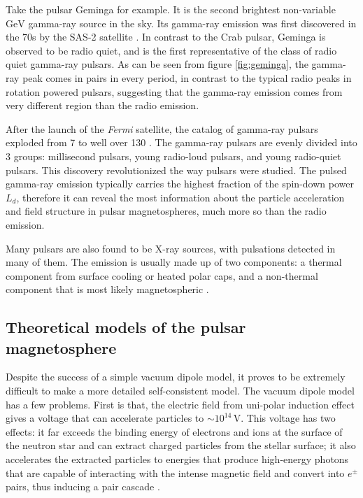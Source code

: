 Take the pulsar Geminga for example. It is the second brightest non-variable
$\mathrm{GeV}$ gamma-ray source in the sky. Its gamma-ray emission was first
discovered in the 70s by the SAS-2 satellite
\citep{fichtel_high-energy_1975,kniffen_distribution_1975}. In contrast to the
Crab pulsar, Geminga is observed to be radio quiet, and is the first
representative of the class of radio quiet gamma-ray pulsars. As can be seen
from figure \ref{fig:geminga}, the gamma-ray peak comes in pairs in every
period, in contrast to the typical radio peaks in rotation powered pulsars,
suggesting that the gamma-ray emission comes from very different region than
the radio emission.

After the launch of the {\it Fermi} satellite, the catalog of gamma-ray pulsars
exploded from 7 to well over 130 \citep{abdo_first_2010,abdo_second_2013}. The
gamma-ray pulsars are evenly divided into 3 groups: millisecond pulsars, young
radio-loud pulsars, and young radio-quiet pulsars. This discovery revolutionized
the way pulsars were studied. The pulsed gamma-ray emission typically carries
the highest fraction of the spin-down power $L_{d}$, therefore it can reveal the
most information about the particle acceleration and field structure in pulsar
magnetospheres, much more so than the radio emission.

Many pulsars are also found to be X-ray sources, with pulsations detected in
many of them. The emission is usually made up of two components: a thermal
component from surface cooling or heated polar caps, and a non-thermal component
that is most likely magnetospheric \citep{kaspi_isolated_2006}.



\subsection{Theoretical models of the pulsar magnetosphere}
\label{sec:intro-pulsar-theory}

Despite the success of a simple vacuum dipole model, it proves to be extremely
difficult to make a more detailed self-consistent model. The vacuum dipole model
has a few problems. First is that, the electric field from uni-polar induction
effect gives a voltage that can accelerate particles to $\sim
10^{14}\,\mathrm{V}$.
This voltage has two effects: it far exceeds the binding energy of electrons and
ions at the surface of the neutron star and can extract charged particles from
the stellar surface; it also accelerates the extracted particles to energies
that produce high-energy photons that are capable of interacting with the
intense magnetic field and convert into $e^{\pm}$ pairs, thus inducing a pair
cascade \citep{erber_high-energy_1966}.

